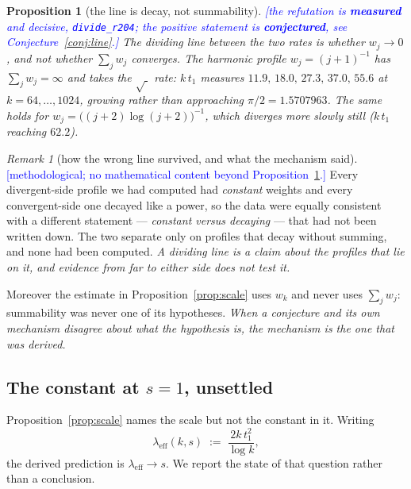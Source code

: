 \documentclass[11pt,a4paper]{article}
\theoremstyle{plain}
\newtheorem{proposition}[theorem]{Proposition}
\theoremstyle{definition}
\theoremstyle{remark}
\newtheorem{remark}[theorem]{Remark}
\newcommand{\STATUS}[1]{\textcolor{blue}{\textsf{[#1]}}}
\begin{document}
\begin{proposition}[the line is decay, not summability]\label{prop:line}
\STATUS{the refutation is \textbf{measured} and decisive, \texttt{divide\_r204}; the
positive statement is \textbf{conjectured}, see Conjecture~\ref{conj:line}.}
The dividing line between the two rates is whether $w_j\to0$, and \emph{not} whether
$\sum_jw_j$ converges. The harmonic profile $w_j=(j+1)^{-1}$ has $\sum_jw_j=\infty$ and
takes the $\sqrt{\;}$ rate: $k\,t_1$ measures
$11.9,\,18.0,\,27.3,\,37.0,\,55.6$ at $k=64,\dots,1024$, growing rather than approaching
$\pi/2=1.5707963$. The same holds for $w_j=\bigl((j+2)\log(j+2)\bigr)^{-1}$, which
diverges more slowly still ($k\,t_1$ reaching $62.2$).
\end{proposition}

\begin{remark}[how the wrong line survived, and what the mechanism said]\label{rem:whyline}
\STATUS{methodological; no mathematical content beyond Proposition~\ref{prop:line}.}
Every divergent-side profile we had computed had \emph{constant} weights and every
convergent-side one decayed like a power, so the data were equally consistent with a
different statement --- \emph{constant versus decaying} --- that had not been written
down. The two separate only on profiles that decay without summing, and none had been
computed. \emph{A dividing line is a claim about the profiles that lie on it, and
evidence from far to either side does not test it.}

Moreover the estimate in Proposition~\ref{prop:scale} uses $w_k$ and never uses
$\sum_jw_j$: summability was never one of its hypotheses. \emph{When a conjecture and
its own mechanism disagree about what the hypothesis is, the mechanism is the one that
was derived.}
\end{remark}

\subsection{The constant at $s=1$, unsettled}\label{sec:s1}

Proposition~\ref{prop:scale} names the scale but not the constant in it. Writing
\[
  \lambda_{\mathrm{eff}}(k,s)\;:=\;\frac{2k\,t_1^{2}}{\log k},
\]
the derived prediction is $\lambda_{\mathrm{eff}}\to s$. We report the state of that
question rather than a conclusion.
\end{document}
